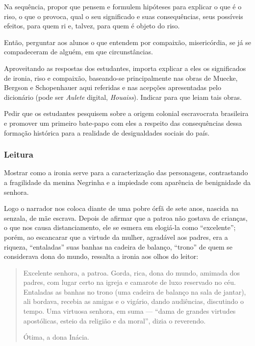 \documentclass[12pt]{extarticle}
\begin{document}
Na sequência, propor que pensem e formulem hipóteses para explicar o que
é o riso, o que o provoca, qual o seu significado e suas consequências,
seus possíveis efeitos, para quem ri e, talvez, para quem é objeto do
riso.

Então, perguntar aos alunos o que entendem por compaixão, misericórdia,
se já se compadeceram de alguém, em que circunstâncias.

Aproveitando as respostas dos estudantes, importa explicar a eles os
significados de ironia, riso e compaixão, baseando-se principalmente nas
obras de Muecke, Bergson e Schopenhauer aqui referidas e nas acepções
apresentadas pelo dicionário (pode ser \emph{Aulete} digital,
\emph{Houaiss}). Indicar para que leiam tais obras.

Pedir que os estudantes pesquisem sobre a origem colonial escravocrata
brasileira e promover um primeiro bate-papo com eles a respeito das
consequências dessa formação histórica para a realidade de desigualdades
sociais do país.

\subsubsection{Leitura}

Mostrar como a ironia serve para a caracterização das personagens,
contrastando a fragilidade da menina Negrinha e a impiedade com
aparência de benignidade da senhora.

Logo o narrador nos coloca diante de uma pobre órfã de sete anos,
nascida na senzala, de mãe escrava. Depois de afirmar que a patroa não
gostava de crianças, o que nos causa distanciamento, ele se esmera em
elogiá-la como ``excelente''; porém, ao escancarar que a virtude da
mulher, agradável aos padres, era a riqueza, ``entaladas'' suas banhas
na cadeira de balanço, ``trono'' de quem se considerava dona do mundo,
ressalta a ironia aos olhos do leitor:

\begin{quote}
Excelente senhora, a patroa. Gorda, rica, dona do mundo, amimada dos
padres, com lugar certo na igreja e camarote de luxo reservado no céu.
Entaladas as banhas no trono (uma cadeira de balanço na sala de jantar),
ali bordava, recebia as amigas e o vigário, dando audiências, discutindo
o tempo. Uma virtuosa senhora, em suma --- ``dama de grandes virtudes
apostólicas, esteio da religião e da moral'', dizia o reverendo.

Ótima, a dona Inácia.
\end{quote}
\end{document}
